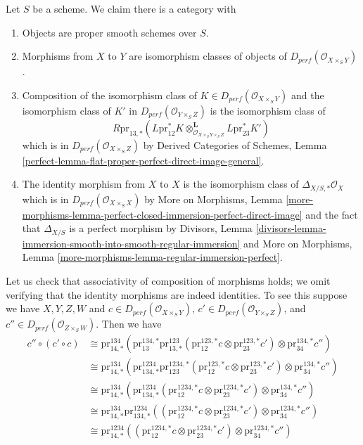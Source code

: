 \documentclass{stacks-project}
\theoremstyle{plain}
\theoremstyle{definition}
\theoremstyle{remark}
\numberwithin{equation}{subsection}
\begin{document}
\noindent
Let $S$ be a scheme. We claim there is a category
with
\begin{enumerate}
\item Objects are proper smooth schemes over $S$.
\item Morphisms from $X$ to $Y$ are isomorphism classes
of objects of $D_{perf}(\mathcal{O}_{X \times_S Y})$.
\item Composition of the isomorphism class of
$K \in D_{perf}(\mathcal{O}_{X \times_S Y})$
and the isomorphism class of $K'$ in $D_{perf}(\mathcal{O}_{Y \times_S Z})$
is the isomorphism class of
$$
R\text{pr}_{13, *}(
L\text{pr}_{12}^*K
\otimes_{\mathcal{O}_{X \times_S Y \times_S Z}}^\mathbf{L}
L\text{pr}_{23}^*K')
$$
which is in $D_{perf}(\mathcal{O}_{X \times_S Z})$ by
Derived Categories of Schemes, Lemma
\ref{perfect-lemma-flat-proper-perfect-direct-image-general}.
\item The identity morphism from $X$ to $X$ is the
isomorphism class of $\Delta_{X/S, *}\mathcal{O}_X$
which is in $D_{perf}(\mathcal{O}_{X \times_S X})$
by More on Morphisms, Lemma
\ref{more-morphisms-lemma-perfect-closed-immersion-perfect-direct-image}
and the fact that $\Delta_{X/S}$ is a perfect morphism by
Divisors, Lemma
\ref{divisors-lemma-immersion-smooth-into-smooth-regular-immersion} and
More on Morphisms, Lemma \ref{more-morphisms-lemma-regular-immersion-perfect}.
\end{enumerate}
Let us check that associativity of composition
of morphisms holds; we omit verifying that the identity
morphisms are indeed identities. To see this suppose we have
$X, Y, Z, W$ and
$c \in D_{perf}(\mathcal{O}_{X \times_S Y})$,
$c' \in D_{perf}(\mathcal{O}_{Y \times_S Z})$, and
$c'' \in D_{perf}(\mathcal{O}_{Z \times_S W})$. Then we have
\begin{align*}
c'' \circ (c' \circ c)
& \cong
\text{pr}^{134}_{14, *}(
\text{pr}^{134, *}_{13}
\text{pr}^{123}_{13, *}(\text{pr}^{123, *}_{12}c \otimes
\text{pr}^{123, *}_{23}c')
\otimes \text{pr}^{134, *}_{34}c'') \\
& \cong
\text{pr}^{134}_{14, *}(
\text{pr}^{1234}_{134, *}
\text{pr}^{1234, *}_{123}(\text{pr}^{123, *}_{12}c \otimes
\text{pr}^{123, *}_{23}c')
\otimes \text{pr}^{134, *}_{34}c'') \\
& \cong
\text{pr}^{134}_{14, *}(
\text{pr}^{1234}_{134, *}
(\text{pr}^{1234, *}_{12}c \otimes
\text{pr}^{1234, *}_{23}c')
\otimes \text{pr}^{134, *}_{34}c'') \\
& \cong
\text{pr}^{134}_{14, *}
\text{pr}^{1234}_{134, *}
((\text{pr}^{1234, *}_{12}c \otimes
\text{pr}^{1234, *}_{23}c')
\otimes \text{pr}^{1234, *}_{34}c'') \\
& \cong
\text{pr}^{1234}_{14, *}(
(\text{pr}^{1234, *}_{12}c \otimes
\text{pr}^{1234, *}_{23}c') \otimes
\text{pr}^{1234, *}_{34}c'')
\end{align*}
\end{document}
